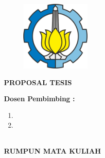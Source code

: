 \begin{flushleft}
    \color{white}
    
    \begin{figure}[h]
        \includegraphics[width=3.5cm, height=3.5cm]{src/resources/its-logo.png}
    \end{figure}
    
    \vspace{4.5cm}
    
    {\selectfont \Large \bfseries \MakeUppercase
        PROPOSAL TESIS
    }
    
    \vspace{25pt}
   	
    {\selectfont \LARGE \bfseries \MakeUppercase
        \thetitle
    }
  	
  	\vspace{25pt}

    \begin{singlespace}
   	    {\selectfont \Large \bfseries
   	        \theauthor
        }
    \end{singlespace}
    
    \vspace{25pt}

    \begin{singlespace}
   	    {\selectfont
            \large \bfseries Dosen Pembimbing :

            \begin{enumerate}
                \item \firstSupervisor
                \item \secondSupervisor
            \end{enumerate}
        }
    \end{singlespace}
    
    \vspace{25pt}

    \begin{singlespace}
   	    {\selectfont
            \large \bfseries \MakeUppercase {
            	\postgraduateProgram \\
                Rumpun Mata Kuliah \postgraduateCourseClass \\
                \postgraduateDepartment \\
                \postgraduateFaculty \\
                \postgraduateUniversity \\
                \postgraduateCity \\
                \postgraduateYear
            }
        }
    \end{singlespace}

\end{flushleft}

\restoregeometry

\clearpage
